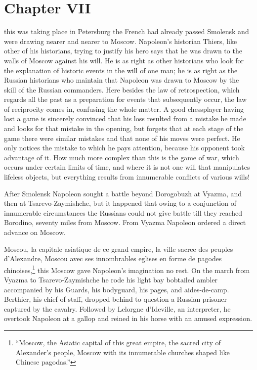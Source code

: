\chapter*{Chapter VII} \ifaudio {}
\fi

 this was taking place in Petersburg the French had already
passed Smolensk and were drawing nearer and nearer to
Moscow. Napoleon's historian Thiers, like other of his
historians, trying to justify his hero says that he was drawn to
the walls of Moscow against his will. He is as right as other
historians who look for the explanation of historic events in the
will of one man; he is as right as the Russian historians who
maintain that Napoleon was drawn to Moscow by the skill of the
Russian commanders. Here besides the law of retrospection, which
regards all the past as a preparation for events that
subsequently occur, the law of reciprocity comes in, confusing
the whole matter. A good chessplayer having lost a game is
sincerely convinced that his loss resulted from a mistake he made
and looks for that mistake in the opening, but forgets that at
each stage of the game there were similar mistakes and that none
of his moves were perfect. He only notices the mistake to which
he pays attention, because his opponent took advantage of it. How
much more complex than this is the game of war, which occurs
under certain limits of time, and where it is not one will that
manipulates lifeless objects, but everything results from
innumerable conflicts of various wills!

After Smolensk Napoleon sought a battle beyond Dorogobuzh at
Vyazma, and then at Tsarevo-Zaymishche, but it happened that
owing to a conjunction of innumerable circumstances the Russians
could not give battle till they reached Borodino, seventy miles
from Moscow. From Vyazma Napoleon ordered a direct advance on
Moscow.

Moscou, la capitale asiatique de ce grand empire, la ville sacree
des peuples d'Alexandre, Moscou avec ses innombrables eglises en
forme de pagodes chinoises,\footnote{``Moscow, the Asiatic
capital of this great empire, the sacred city of Alexander's
people, Moscow with its innumerable churches shaped like Chinese
pagodas.''} this Moscow gave Napoleon's imagination no rest. On
the march from Vyazma to Tsarevo-Zaymishche he rode his light bay
bobtailed ambler accompanied by his Guards, his bodyguard, his
pages, and aides-de-camp. Berthier, his chief of staff, dropped
behind to question a Russian prisoner captured by the
cavalry. Followed by Lelorgne d'Ideville, an interpreter, he
overtook Napoleon at a gallop and reined in his horse with an
amused expression.


